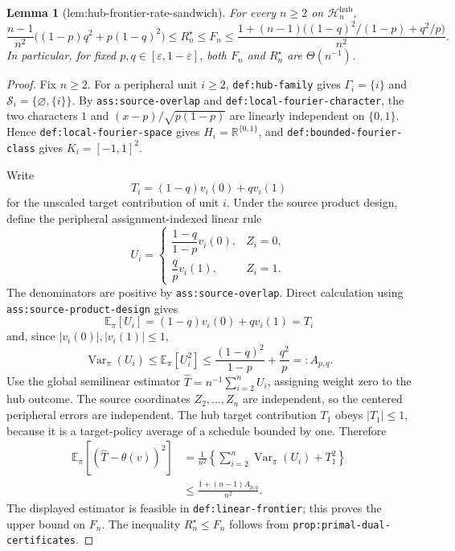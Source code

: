 \documentclass{article}
\newtheorem{lemma}{Lemma}
\begin{document}
\begin{lemma}[lem:hub-frontier-rate-sandwich]\label{lem:hub-frontier-rate-sandwich}
For every \(n\ge2\) on \(\mathcal H_n^{\mathrm{hub}}\),
\[
 \frac{n-1}{n^2}\bigl((1-p)q^2+p(1-q)^2\bigr)
 \le R_n^{\star}\le F_n
 \le \frac{1+(n-1)\bigl((1-q)^2/(1-p)+q^2/p\bigr)}{n^2}.
\]
In particular, for fixed \(p,q\in[\varepsilon,1-\varepsilon]\), both \(F_n\) and \(R_n^{\star}\) are \(\Theta(n^{-1})\).
\end{lemma}
\begin{proof}
Fix \(n\ge2\).  For a peripheral unit \(i\ge2\), \texttt{def:hub-family} gives \(\Gamma_i=\{i\}\) and \(\mathcal S_i=\{\varnothing,\{i\}\}\).  By \texttt{ass:source-overlap} and \texttt{def:local-fourier-character}, the two characters \(1\) and \((x-p)/\sqrt{p(1-p)}\) are linearly independent on \(\{0,1\}\).  Hence \texttt{def:local-fourier-space} gives \(H_i=\mathbb R^{\{0,1\}}\), and \texttt{def:bounded-fourier-class} gives \(K_i=[-1,1]^2\).

Write
\[
 T_i=(1-q)v_i(0)+qv_i(1)
\]
for the unscaled target contribution of unit \(i\).  Under the source product design, define the peripheral assignment-indexed linear rule
\[
 U_i=
 \begin{cases}
 \dfrac{1-q}{1-p}v_i(0),&Z_i=0,\\[5pt]
 \dfrac{q}{p}v_i(1),&Z_i=1.
 \end{cases}
\]
The denominators are positive by \texttt{ass:source-overlap}.  Direct calculation using \texttt{ass:source-product-design} gives
\[
 \mathbb E_{\pi}[U_i]=(1-q)v_i(0)+qv_i(1)=T_i
\]
and, since \(|v_i(0)|,|v_i(1)|\le1\),
\[
 \operatorname{Var}_{\pi}(U_i)
 \le \mathbb E_{\pi}[U_i^2]
 \le \frac{(1-q)^2}{1-p}+\frac{q^2}{p}=:A_{p,q}.
\]
Use the global semilinear estimator \(\widehat T=n^{-1}\sum_{i=2}^nU_i\), assigning weight zero to the hub outcome.  The source coordinates \(Z_2,\ldots,Z_n\) are independent, so the centered peripheral errors are independent.  The hub target contribution \(T_1\) obeys \(|T_1|\le1\), because it is a target-policy average of a schedule bounded by one.  Therefore
\[
\begin{aligned}
 \mathbb E_{\pi}[(\widehat T-\theta(v))^2]
 &=\frac1{n^2}\left\{
 \sum_{i=2}^n\operatorname{Var}_{\pi}(U_i)+T_1^2\right\}\\
 &\le \frac{1+(n-1)A_{p,q}}{n^2}.
\end{aligned}
\]
The displayed estimator is feasible in \texttt{def:linear-frontier}; this proves the upper bound on \(F_n\).  The inequality \(R_n^{\star}\le F_n\) follows from \texttt{prop:primal-dual-certificates}.


\end{proof}
\end{document}
